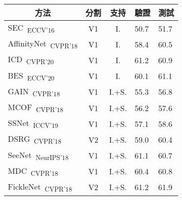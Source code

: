 \begin{table}[]
\normalsize
\centering
{\small
\begin{tabular}{@{}lccll@{}}
\toprule
\multicolumn{1}{c}{方法}                                                              & 分割      & 支持  & \multicolumn{1}{c}{驗證} & \multicolumn{1}{c}{測試} \\ \midrule
\multicolumn{1}{l}{SEC~\cite{kolesnikov2016seed}\textsubscript{ECCV'16}}                & V1        & I.    & 50.7                    & 51.7                     \\
\multicolumn{1}{l}{AffinityNet~\cite{ahn2018learning}\textsubscript{CVPR'18}}           & V1        & I.    & 58.4                    & 60.5                     \\
\multicolumn{1}{l}{ICD~\cite{fan2020learning}\textsubscript{CVPR'20}}                   & V1        & I.    & 61.2                    & 60.9                     \\
\multicolumn{1}{l}{BES~\cite{chen2020boundary}\textsubscript{ECCV'20}}                  & V1        & I.    & 60.1                    & 61.1                     \\
\multicolumn{1}{l}{GAIN~\cite{li2018tell}\textsubscript{CVPR'18}}                       & V1        & I.+S. & 55.3                    & 56.8                     \\
\multicolumn{1}{l}{MCOF~\cite{wang2018weakly}\textsubscript{CVPR'18}}                   & V1        & I.+S. & 56.2                    & 57.6                     \\
\multicolumn{1}{l}{SSNet~\cite{zeng2019joint}\textsubscript{ICCV'19}}                   & V1        & I.+S. & 57.1                    & 58.6                     \\
\multicolumn{1}{l}{DSRG~\cite{huang2018weakly}\textsubscript{CVPR'18}}                  & V2        & I.+S. & 59.0                    & 60.4                     \\
\multicolumn{1}{l}{SeeNet~\cite{hou2018self}\textsubscript{NeurIPS'18}}                 & V1        & I.+S. & 61.1                    & 60.7                     \\
\multicolumn{1}{l}{MDC~\cite{wei2018revisiting}\textsubscript{CVPR'18}}                 & V1        & I.+S. & 60.4                    & 60.8                     \\
\multicolumn{1}{l}{FickleNet~\cite{lee2019ficklenet}\textsubscript{CVPR'18}}            & V2        & I.+S. & 61.2                    & 61.9                     \\

\end{tabular}}
\end{table}
